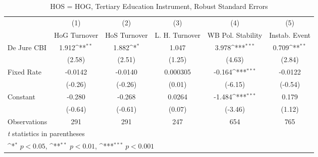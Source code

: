 \begin{table}[htbp]\centering
\def\sym#1{\ifmmode^{#1}\else\(^{#1}\)\fi}
\caption{HOS = HOG, Tertiary Education Instrument, Robust Standard Errors \label{hoshogfivs}}
\begin{tabular}{l*{5}{c}}
\toprule
                                        &\multicolumn{1}{c}{(1)}&\multicolumn{1}{c}{(2)}&\multicolumn{1}{c}{(3)}&\multicolumn{1}{c}{(4)}&\multicolumn{1}{c}{(5)}\\
                                        &\multicolumn{1}{c}{HoG Turnover}&\multicolumn{1}{c}{HoS Turnover}&\multicolumn{1}{c}{L. H. Turnover}&\multicolumn{1}{c}{WB Pol. Stability}&\multicolumn{1}{c}{Instab. Event}\\
\midrule
De Jure CBI                             &    1.912\sym{**} &    1.882\sym{*}  &    1.047         &    3.978\sym{***}&    0.709\sym{**} \\
                                        &   (2.58)         &   (2.51)         &   (1.25)         &   (4.63)         &   (2.84)         \\
\addlinespace
Fixed Rate                              &  -0.0142         &  -0.0140         & 0.000305         &   -0.164\sym{***}&  -0.0122         \\
                                        &  (-0.26)         &  (-0.26)         &   (0.01)         &  (-6.15)         &  (-0.54)         \\
\addlinespace
Constant                                &   -0.280         &   -0.268         &   0.0264         &   -1.484\sym{***}&    0.179         \\
                                        &  (-0.64)         &  (-0.61)         &   (0.07)         &  (-3.46)         &   (1.12)         \\
\midrule
Observations                            &      291         &      291         &      247         &      654         &      765         \\
\bottomrule
\multicolumn{6}{l}{\footnotesize \textit{t} statistics in parentheses}\\
\multicolumn{6}{l}{\footnotesize \sym{*} \(p<0.05\), \sym{**} \(p<0.01\), \sym{***} \(p<0.001\)}\\
\end{tabular}
\end{table}
